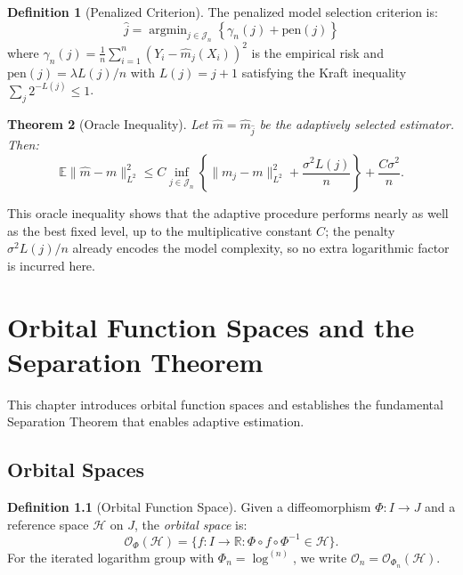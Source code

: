 \documentclass[11pt,twoside,openright]{book}
\theoremstyle{plain}
\newtheorem{theorem}{Theorem}[chapter]
\theoremstyle{definition}
\newtheorem{definition}[theorem]{Definition}
\theoremstyle{remark}
\newcommand{\calH}{\mathcal{H}}
\newcommand{\calO}{\mathcal{O}}
\newcommand{\calJ}{\mathcal{J}}
\newcommand{\Rd}{\mathbb{R}}
\newcommand{\norm}[1]{\|#1\|}
\newcommand{\E}{\mathbb{E}}
\DeclareMathOperator{\argmin}{argmin}
\begin{document}
\begin{definition}[Penalized Criterion]
The penalized model selection criterion is:
\begin{equation}
\hat{j} = \argmin_{j \in \calJ_n} \left\{ \gamma_n(j) + \text{pen}(j) \right\}
\label{eq:penalized-criterion}
\end{equation}
where $\gamma_n(j) = \frac{1}{n} \sum_{i=1}^n (Y_i - \hat{m}_j(X_i))^2$ is the empirical risk and $\text{pen}(j) = \lambda L(j) / n$ with $L(j) = j + 1$ satisfying the Kraft inequality $\sum_j 2^{-L(j)} \leq 1$.
\end{definition}

\begin{theorem}[Oracle Inequality]
\label{thm:oracle}
Let $\hat{m} = \hat{m}_{\hat{j}}$ be the adaptively selected estimator. Then:
\begin{equation}
\E\norm{\hat{m} - m}_{L^2}^2 \leq C \inf_{j \in \calJ_n} \left\{ \norm{m_j - m}_{L^2}^2 + \frac{\sigma^2 L(j)}{n} \right\} + \frac{C\sigma^2}{n}.
\label{eq:oracle-inequality}
\end{equation}
\end{theorem}

This oracle inequality shows that the adaptive procedure performs nearly as well as the best fixed level, up to the multiplicative constant $C$; the penalty $\sigma^2 L(j)/n$ already encodes the model complexity, so no extra logarithmic factor is incurred here.


\chapter{Orbital Function Spaces and the Separation Theorem}
\label{ch:orbital-spaces}

This chapter introduces orbital function spaces and establishes the fundamental Separation Theorem that enables adaptive estimation.

\section{Orbital Spaces}

\begin{definition}[Orbital Function Space]
\label{def:orbital-space}
Given a diffeomorphism $\Phi : I \to J$ and a reference space $\calH$ on $J$, the \emph{orbital space} is:
\[
\calO_\Phi(\calH) = \{f : I \to \Rd : \Phi \circ f \circ \Phi^{-1} \in \calH\}.
\]
For the iterated logarithm group with $\Phi_n = \log^{(n)}$, we write $\calO_n = \calO_{\Phi_n}(\calH)$.
\end{definition}
\end{document}
